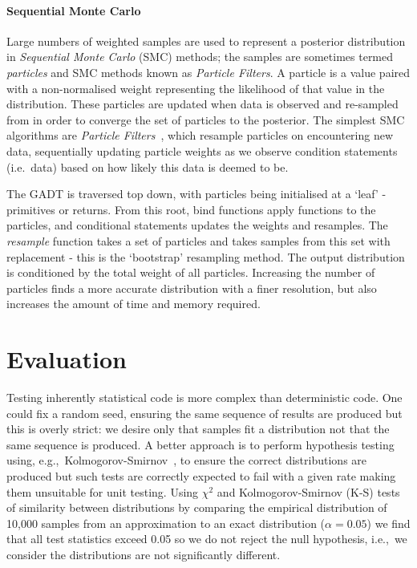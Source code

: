 \documentclass[sigconf]{acmart}
\begin{document}
\paragraph{Sequential Monte Carlo}
Large numbers of weighted samples are used to represent a posterior distribution in \emph{Sequential Monte Carlo} (SMC) methods; the samples are sometimes termed \emph{particles} and SMC methods known as \emph{Particle Filters}. A particle is a value paired with a non-normalised weight representing the likelihood of that value in the distribution. These particles are updated when data is observed and re-sampled from in order to converge the set of particles to the posterior. The simplest SMC algorithms are \emph{Particle Filters}~\cite{particlefilter}, which resample particles on encountering new data, sequentially updating particle weights as we observe condition statements (i.e.~data) based on how likely this data is deemed to be.

The GADT is traversed top down, with particles being initialised at a `leaf' - primitives or returns. From this root, bind functions apply functions to the particles, and conditional statements updates the weights and resamples. The \emph{resample} function takes a set of particles and takes samples from this set with replacement - this is the `bootstrap' resampling method. The output distribution is conditioned by the total weight of all particles. Increasing the number of particles finds a more accurate distribution with a finer resolution, but also increases the amount of time and memory required.

\section{Evaluation}
\label{s:evaluation}

Testing inherently statistical code is more complex than deterministic code. One could fix a random seed, ensuring the same sequence of results are produced but this is overly strict: we desire only that samples fit a distribution not that the same sequence is produced. A better approach is to perform hypothesis testing using, e.g.,~Kolmogorov-Smirnov~\cite{massey1951kolmogorov}, to ensure the correct distributions are produced but such tests are correctly expected to fail with a given rate making them unsuitable for unit testing. Using $\chi^2$ and Kolmogorov-Smirnov (K-S) tests of similarity between distributions by comparing the empirical distribution of 10,000 samples from an approximation to an exact distribution ($\alpha = 0.05$) we find that all test statistics exceed 0.05 so we do not reject the null hypothesis, i.e.,~we consider the distributions are not significantly different.
\end{document}
